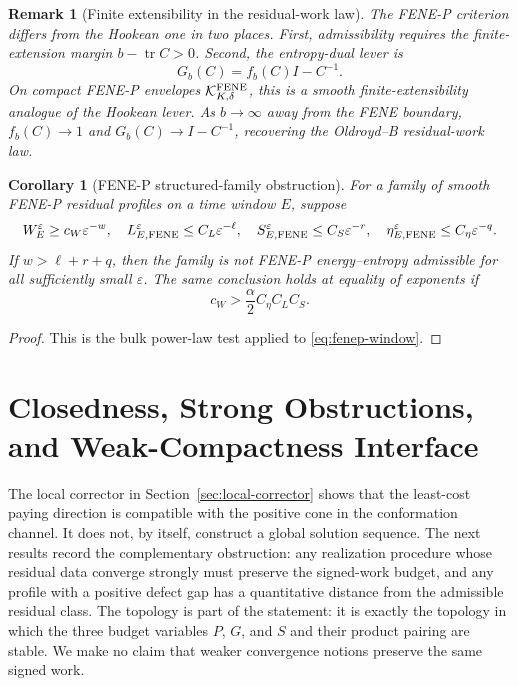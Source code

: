 \documentclass[11pt]{article}
\numberwithin{equation}{section}
\newtheorem{corollary}[theorem]{Corollary}
\newtheorem{remark}[theorem]{Remark}
\newcommand{\tr}{\operatorname{tr}}
\newcommand{\calK}{\mathcal K}
\begin{document}
\begin{remark}[Finite extensibility in the residual-work law]
The FENE-P criterion differs from the Hookean one in two places.  First,
admissibility requires the finite-extension margin \(b-\tr C>0\).  Second, the
entropy-dual lever is
\[
  G_b(C)=f_b(C)I-C^{-1}.
\]
On compact FENE-P envelopes \(\calK_{K,\delta}^{\rm FENE}\), this is a smooth
finite-extensibility analogue of the Hookean lever.  As \(b\to\infty\) away
from the FENE boundary, \(f_b(C)\to1\) and \(G_b(C)\to I-C^{-1}\), recovering
the Oldroyd--B residual-work law.
\end{remark}

\begin{corollary}[FENE-P structured-family obstruction]
\label{cor:fenep-structured}
For a family of smooth FENE-P residual profiles on a time window \(E\), suppose
\[
  W_E^\varepsilon\ge c_W\varepsilon^{-w},\quad
  L_{E,{\rm FENE}}^\varepsilon\le C_L\varepsilon^{-\ell},\quad
  S_{E,{\rm FENE}}^\varepsilon\le C_S\varepsilon^{-r},\quad
  \eta_{E,{\rm FENE}}^\varepsilon\le C_\eta\varepsilon^{-q}.
\]
If \(w>\ell+r+q\), then the family is not FENE-P
energy--entropy admissible for all sufficiently small \(\varepsilon\).  The
same conclusion holds at equality of exponents if
\[
  c_W>\frac{\alpha}{2}C_\eta C_LC_S .
\]
\end{corollary}

\begin{proof}
This is the bulk power-law test applied to
\eqref{eq:fenep-window}.
\end{proof}

\section{Closedness, Strong Obstructions, and Weak-Compactness Interface}
\label{sec:closed-realization}

The local corrector in Section~\ref{sec:local-corrector} shows that the
least-cost paying direction is compatible with the positive cone in the
conformation channel.  It does not, by itself, construct a global solution
sequence.  The next results record the complementary obstruction: any
realization procedure whose residual data converge strongly must preserve the
signed-work budget, and any profile with a positive defect gap has a
quantitative distance from the admissible residual class.  The topology is part
of the statement: it is exactly the topology in which the three budget variables
\(P\), \(G\), and \(S\) and their product pairing are stable.  We make no claim
that weaker convergence notions preserve the same signed work.
\end{document}
